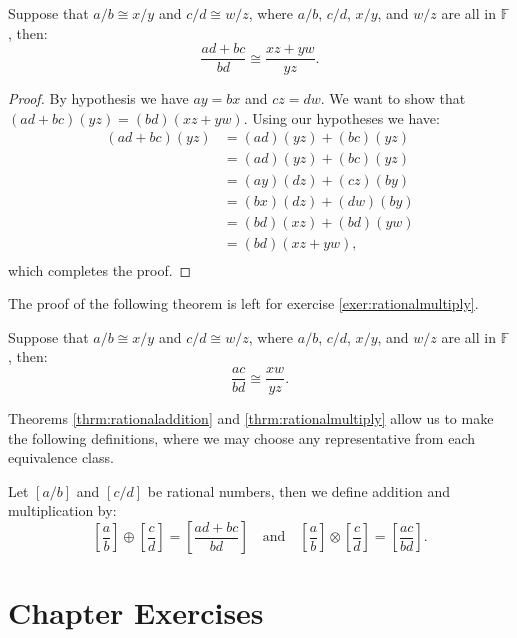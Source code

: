 \begin{thrm}\label{thrm:rationaladdition}
Suppose that $a/b\cong x/y$ and $c/d\cong w/z$, where $a/b$, $c/d$, $x/y$, and $w/z$ are all in $\mathbb F$, then: \[ \frac{ad+bc}{bd}\cong \frac{xz+yw}{
yz}.\]
\end{thrm}

\begin{proof}
By hypothesis we have $ay=bx$ and $cz=dw$. We want to show that $(ad+bc)(yz)=(bd)(xz+yw)$. Using our hypotheses we have:
\begin{equation*}
\begin{split}
(ad+bc)(yz)&=(ad)(yz)+(bc)(yz)\\
&=(ad)(yz)+(bc)(yz)\\
&=(ay)(dz)+(cz)(by)\\
&=(bx)(dz)+(dw)(by)\\
&=(bd)(xz)+(bd)(yw)\\
&=(bd)(xz+yw)\text{,}\\
\end{split}
\end{equation*}
which completes the proof.
\end{proof}

The proof of the following theorem is left for exercise \ref{exer:rationalmultiply}.

\begin{thrm}\label{thrm:rationalmultiply}
Suppose that $a/b\cong x/y$ and $c/d\cong w/z$, where $a/b$, $c/d$, $x/y$, and $w/z$ are all in $\mathbb F$, then: \[ \frac{ac}{bd}\cong \frac{xw}{yz}.\]
\end{thrm}

Theorems \ref{thrm:rationaladdition} and \ref{thrm:rationalmultiply} allow us to make the following definitions, where we may choose any representative from each equivalence class.

\begin{definition}
Let $[a/b]$ and $[c/d]$ be rational numbers, then we define addition and multiplication by:
\[\left[ \frac ab\right] \oplus \left[ \frac cd\right] =\left[ \frac{ad+bc}{bd} \right] \quad\text{and}\quad \left[ \frac ab\right] \otimes\left[ \frac cd\right] =\left[\frac{ac}{bd}\right]\text{.}\]
\end{definition}

\clearpage

\section*{Chapter  Exercises}
\anschapter

